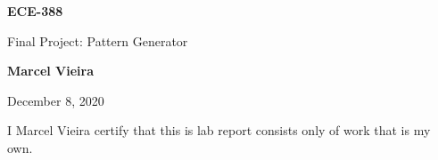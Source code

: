 \begin{titlepage}
    \begin{center}
        \vspace*{4cm}

        \Huge
        \textbf{ECE-388}
        
        \Large
        \vspace{0.5cm}
        Final Project: Pattern Generator 
        
        \vspace{8.5cm}
        \textbf{Marcel Vieira}
    
        December 8, 2020
        
        \small
        \vspace{0.5cm}
        I Marcel Vieira certify that this is lab report consists only of work that is my own.
        
    \end{center}
\end{titlepage}